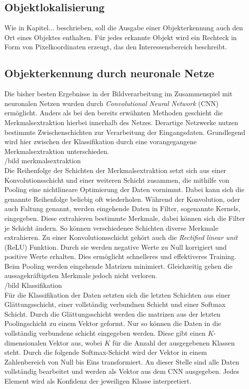 		\subsection{Objektlokalisierung}
		Wie in Kapitel... beschrieben, soll die Ausgabe einer Objekterkennung auch den Ort eines Objektes enthalten. Für jedes erkannte Objekt wird ein Rechteck in Form von Pixelkoordinaten erzeugt, das den Interessensbereich beschreibt.
	
		\subsection{Objekterkennung durch neuronale Netze}
		
		Die bisher besten Ergebnisse in der Bildverarbeitung im Zusammenspiel mit neuronalen Netzen wurden durch \textit{Convolutional Neural Network} (CNN) ermöglicht. Anders als bei den bereits erwähnten Methoden geschieht die Merkmalsextraktion hierbei innerhalb des Netzes. Derartige Netzwerke nutzen bestimmte Zwischenschichten zur Verarbeitung der Eingangsdaten. Grundlegend wird hier zwischen der Klassifikation durch eine vorangegangene Merkmalsextraktion unterschieden.\\ 
		
		/bild merkmalsextraktion\\
		
		Die Reihenfolge der Schichten der Merkmalsextraktion setzt sich aus einer Konvolutionsschicht und einer weiteren Schicht zusammen, die mithilfe von Pooling eine nichtlineare Optimierung der Daten vornimmt. Dabei kann sich die genannte Reihenfolge beliebig oft wiederholen. Während der Konvolution, oder auch Faltung genannt, werden eingehende Daten in Filter, sogenannte Kernels, eingegeben. Diese extrahieren bestimmte Merkmale, dabei können sich die Filter je Schicht ändern. So können verschiedenee Schichten diverse Merkmale extrahieren. Zu einer Konvolutionsschicht gehört auch die \textit{Rectified linear unit} (ReLU) Funktion. Durch sie werden negative Werte zu Null korrigiert und positive Werte erhalten. Dies ermöglicht schnelleres und effektiveres Training. Beim Pooling werden eingehende Matrizen minimiert. Gleichzeitig gehen die aussagekräftigsten Merkmale jedoch nicht verloren. \\
		
		/bild Klassifikation\\
		
		Für die Klassifikation der Daten setzten sich die letzten Schichten aus einer Glättungsschicht, einer vollständig verbundnen Schicht und einer Softmax Schicht. Durch die Glättungsschicht werden die matrizen aus der letzten Poolingschicht zu einem Vektor geformt. Nur so können die Daten in die vollständig verbundene schicht eingegeben werden. Diese gibt einen $K$-dimensionalen Vektor aus, wobei $K$ für die Anzahl der ausgegebenen Klassen steht. Durch die folgende Softmax-Schicht wird der Vektor in einem Zahlenbereich von Null bis Eins transformiert. An dieser Stelle sind alle Daten vollständig bearbeitet und werden als Vektor aus dem CNN ausgegeben. Jedes Element wird als Konfidenz der jeweiligen Klasse interpretiert. 
		
